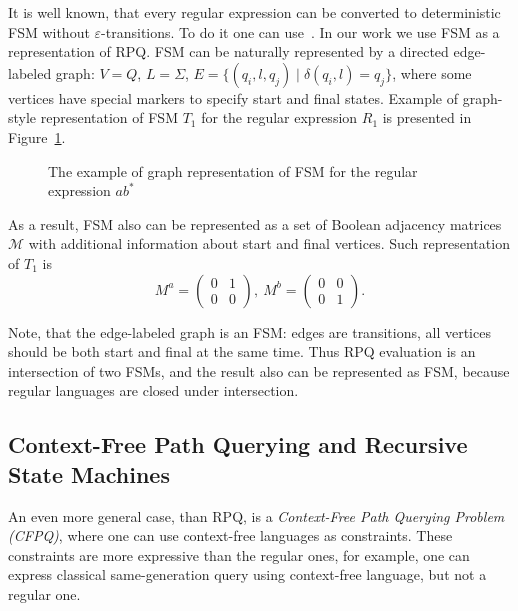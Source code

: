 It is well known, that every regular expression can be converted to deterministic FSM without $\varepsilon$-transitions.
To do it one can use~\cite{automata:theory:10.5555/1177300}.
In our work we use FSM as a representation of RPQ. 
FSM can be naturally represented by a directed edge-labeled graph: $V = Q$, $L = \Sigma$, $E = \{(q_i,l,q_j) \mid \delta(q_i,l) = q_j\}$, where some vertices have special markers to specify start and final states. Example of graph-style representation of FSM $T_1$ for the regular expression $R_1$ is presented in Figure~\ref{fig:example_fsm}.

\begin{figure}[h]
    \centering        
    \caption{The example of graph representation of FSM for the regular expression $ab^*$}
    \label{fig:example_fsm}
\end{figure}

As a result, FSM also can be represented as a set of Boolean adjacency matrices $\mathcal{M}$ with additional information about start and final vertices. Such representation of $T_1$ is
$$
M^a =
\begin{pmatrix}
0&1 \\
0&0
\end{pmatrix},~
M^b =
\begin{pmatrix}
0&0 \\
0&1
\end{pmatrix}.
$$  

Note, that the edge-labeled graph is an FSM: edges are transitions, all vertices should be both start and final at the same time.
Thus RPQ evaluation is an intersection of two FSMs, and the result also can be represented as FSM, because regular languages are closed under intersection.

\subsection{Context-Free Path Querying and Recursive State Machines}

An even more general case, than RPQ, is a \textit{Context-Free Path Querying Problem (CFPQ)}, where one can use context-free languages as constraints. These constraints are more expressive than the regular ones, for example, one can express classical same-generation query using context-free language, but not a regular one.


